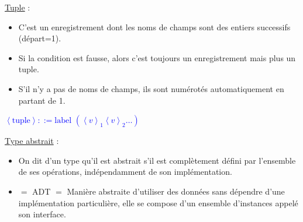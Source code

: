 \documentclass[fr,license=none]{../../../eplsummary}
\begin{document}
\begin{flushleft}
\textcolor{mauvedef}{\underline{Tuple}} : 

\begin{itemize}
\item C'est un enregistrement dont les noms de champs sont des entiers successifs (départ=1).
\item Si la condition est fausse, alors c'est toujours un enregistrement mais plus un tuple.
\item S'il n'y a pas de noms de champs, ils sont numérotés automatiquement en partant de 1.
\end{itemize}

\begin{center}
\textcolor{blue}{$\left\langle \text{tuple} \right\rangle ::=  \text{label }  ( \left\langle v \right\rangle_1  \left\langle v \right\rangle_2 \ldots ) $}
\end{center}

\bigbreak


\textcolor{mauvedef}{\underline{Type abstrait}} :

\begin{itemize}
\item On dit d'un type qu'il est abstrait s'il est complètement défini par l'ensemble de ses opérations, indépendamment de son implémentation.
\item $=$ ADT $=$ Manière abstraite d'utiliser des données sans dépendre d'une implémentation particulière, elle se compose d'un ensemble d'instances appelé son interface.
\end{itemize}\bigbreak

\end{flushleft}
\end{document}

